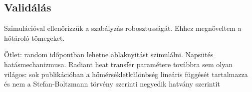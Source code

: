 	


\subsection{Validálás}
Szimulációval ellenőrizzük a szabályzás robosztusságát. Ehhez megnöveltem a hőtároló tömegeket.

Ötlet: random időpontban lehetne ablaknyitást szimulálni.
Napsütés hatásmechanizmusa.
Radiant heat transfer paramétere továbbra sem olyan világos: sok publikációban a hőmérsékletkülönbség lineáris függését tartalmazza és nem a Stefan-Boltzmann törvény szerinti negyedik hatvány szerintit